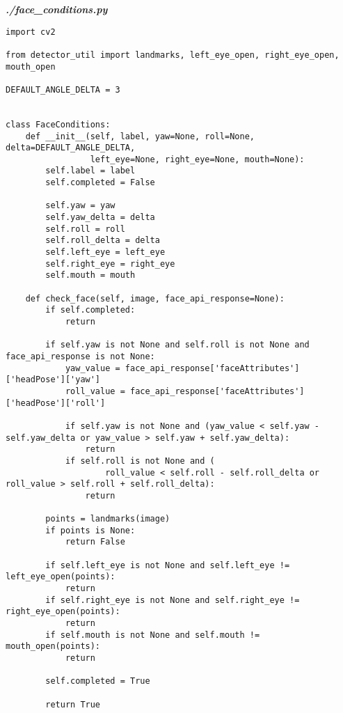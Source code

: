 \textit{\textbf{./face\_conditions.py}}
\begin{verbatim}
import cv2

from detector_util import landmarks, left_eye_open, right_eye_open, mouth_open

DEFAULT_ANGLE_DELTA = 3


class FaceConditions:
    def __init__(self, label, yaw=None, roll=None, delta=DEFAULT_ANGLE_DELTA,
                 left_eye=None, right_eye=None, mouth=None):
        self.label = label
        self.completed = False

        self.yaw = yaw
        self.yaw_delta = delta
        self.roll = roll
        self.roll_delta = delta
        self.left_eye = left_eye
        self.right_eye = right_eye
        self.mouth = mouth

    def check_face(self, image, face_api_response=None):
        if self.completed:
            return

        if self.yaw is not None and self.roll is not None and face_api_response is not None:
            yaw_value = face_api_response['faceAttributes']['headPose']['yaw']
            roll_value = face_api_response['faceAttributes']['headPose']['roll']

            if self.yaw is not None and (yaw_value < self.yaw - self.yaw_delta or yaw_value > self.yaw + self.yaw_delta):
                return
            if self.roll is not None and (
                    roll_value < self.roll - self.roll_delta or roll_value > self.roll + self.roll_delta):
                return

        points = landmarks(image)
        if points is None:
            return False

        if self.left_eye is not None and self.left_eye != left_eye_open(points):
            return
        if self.right_eye is not None and self.right_eye != right_eye_open(points):
            return
        if self.mouth is not None and self.mouth != mouth_open(points):
            return

        self.completed = True

        return True
\end{verbatim}

